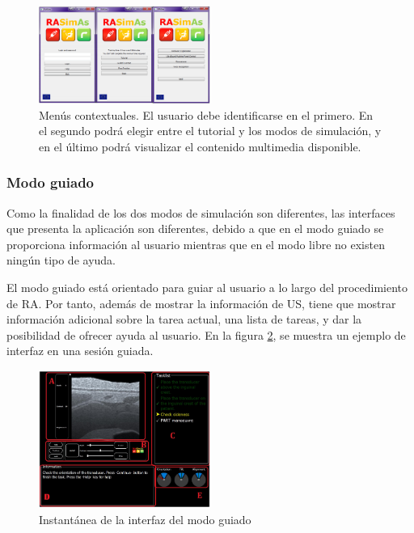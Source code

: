 \begin{figure}[h]
    \centering
    \includegraphics[width=0.5\textwidth]{IMG/coursewareintro.PNG}
    \caption{Menús contextuales. El usuario debe identificarse en el primero. En el segundo podrá elegir entre el tutorial y los modos de simulación, y en el último podrá visualizar el contenido multimedia disponible.}
    \label{fig:courseintro}
\end{figure}

\subsubsection{Modo guiado}

Como la finalidad de los dos modos de simulación son diferentes, las interfaces que presenta la aplicación son diferentes, debido a que en el modo guiado se proporciona información al usuario mientras que en el modo libre no existen ningún tipo de ayuda.

El modo guiado está orientado para guiar al usuario a lo largo del procedimiento de \ac{RA}. Por tanto, además de mostrar la información de \ac{US}, tiene que mostrar información adicional sobre la tarea actual, una lista de tareas, y dar la posibilidad de ofrecer ayuda al usuario. En la figura \ref{fig:guidedui}, se muestra un ejemplo de interfaz en una sesión guiada.
\begin{figure}[h]
    \centering
    \includegraphics[width=0.5\textwidth]{IMG/guidedui.PNG}
    \caption{Instantánea de la interfaz del modo guiado}
    \label{fig:guidedui}
\end{figure}


